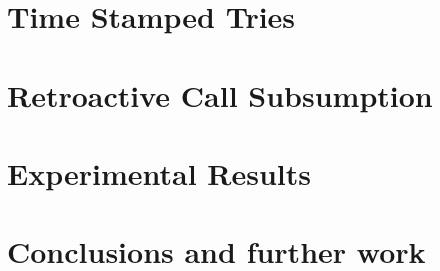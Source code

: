 \documentclass[12pt,a4paper]{report}
\begin{document}
\chapter{Time Stamped Tries}


\chapter{Retroactive Call Subsumption}


\chapter{Experimental Results}


\chapter{Conclusions and further work}

\appendix

  
\renewcommand{\bibname}{References}

{}
\end{document}
